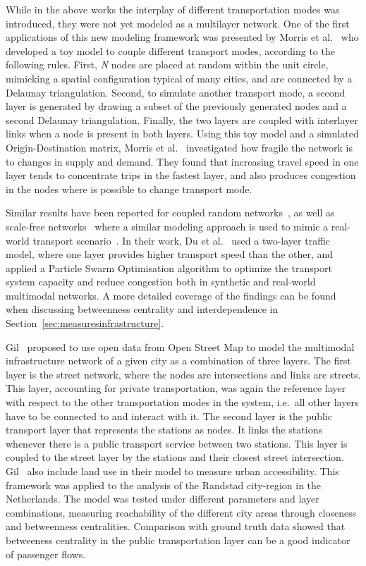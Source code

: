 While in the above works the interplay of different transportation modes was introduced, they were not yet  modeled as a multilayer network. One of the first applications of this new modeling framework was presented by Morris et al.~\cite{morris2012transport} who developed a toy model to couple different transport modes, according to the following rules. First, \textit{N} nodes are placed at random within the unit circle, mimicking a spatial configuration typical of many cities, and are connected by a Delaunay triangulation. Second, to simulate another transport mode, a second layer is generated by drawing a subset of the previously generated nodes and a second Delaunay triangulation. Finally, the two layers are coupled with interlayer links when a node is present in both layers. Using this toy model and a simulated Origin-Destination matrix, Morris et al.~\cite{morris2012transport} investigated how fragile the network is to changes in supply and demand. They found that increasing travel speed in one layer tends to concentrate trips in the fastest layer, and also produces congestion in the nodes where is possible to change transport mode.

Similar results have been reported for coupled random networks~\cite{gao2017comprehensive}, as well as scale-free networks~\cite{zhuo2011traffic} where a similar modeling approach is used to mimic a real-world transport scenario~\cite{du2016physics}. In their work, Du et al.~\cite{du2016physics} used a two-layer traffic model, where one layer provides higher transport speed than the other, and applied a Particle Swarm Optimisation algorithm to optimize the transport system capacity and reduce congestion both in synthetic and real-world multimodal networks. A more detailed coverage of the findings can be found when discussing betweenness centrality and interdependence in Section~\ref{sec:measuresinfrastructure}. 

Gil~\cite{gil2014configuration} proposed to use open data from Open Street Map to model the multimodal infrastructure network of a given city as a combination of three layers. The first layer is the street network, where the nodes are intersections and links are streets. This layer, accounting for private transportation, was again the reference layer with respect to the other transportation modes in the system, i.e.~all other layers have to be connected to and interact with it. The second layer is the public transport layer that represents the stations as nodes. It links the stations whenever there is a public transport service between two stations. This layer is coupled to the street layer by the stations and their closest street intersection. Gil~\cite{gil2014configuration} also include land use in their model to measure urban accessibility. This framework was applied to the analysis of the Randstad city-region in the Netherlands. The model was tested under different parameters and layer combinations, measuring reachability of the different city areas through closeness and betweenness centralities. Comparison with ground truth data showed that betweeness centrality in the public transportation layer can be a good indicator of passenger flows.

